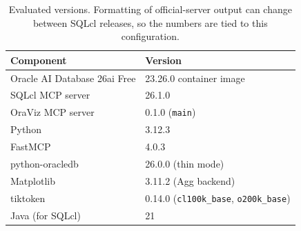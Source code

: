 \begin{table}[h]
\centering
\small
\begin{tabular}{ll}
\toprule
Component & Version \\
\midrule
Oracle AI Database 26ai Free & 23.26.0 container image \\
SQLcl MCP server & 26.1.0 \\
OraViz MCP server & 0.1.0 (\texttt{main}) \\
Python & 3.12.3 \\
FastMCP & 4.0.3 \\
python-oracledb & 26.0.0 (thin mode) \\
Matplotlib & 3.11.2 (Agg backend) \\
tiktoken & 0.14.0 (\texttt{cl100k\_base}, \texttt{o200k\_base}) \\
Java (for SQLcl) & 21 \\
\bottomrule
\end{tabular}
\caption{Evaluated versions. Formatting of official-server output can change between SQLcl releases, so the numbers are tied to this configuration.}
\label{tab:versions}
\end{table}
